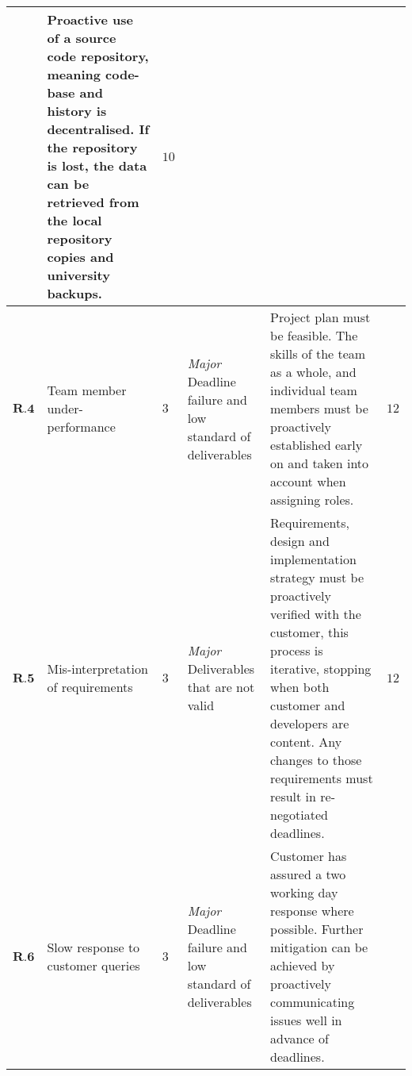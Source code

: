\begin{longtable}[H]{| p{0.6cm} | p{2cm} | p{0.3cm} | p{2.6cm} | p{8.1cm} | p{0.7cm} |}
    & Proactive use of a source code repository, meaning code-base and history is decentralised. If the repository is lost, the data can be retrieved from the local repository copies and university backups.                                                                                                                                                                                                                                                                                                        
    & $10$    \\ \hline
    $\textbf{R.4}$     & Team member under-performance                    & $3$         & \textit{Major}
\newline Deadline failure and low standard  of deliverables            
    & Project plan must be feasible. The skills of the team as a whole, and individual team members must be proactively established early on and taken into account when assigning roles.                                                                                                                                                                                                                                                                                                                                                              
    & $12$    \\ \hline
    $\textbf{R.5}$    & Mis-interpretation of requirements                & $3$        & \textit{Major}
\newline Deliverables that are not valid                                        & 
    Requirements, design and implementation strategy must be proactively verified with the customer, this process is iterative, stopping when both customer and developers are content. Any changes to those requirements must result in re-negotiated deadlines.                                                                                                                                                                                                                                                                                    
    & $12$    \\ \hline
    $\textbf{R.6}$    & Slow response to customer queries                & $3$        & \textit{Major}
\newline Deadline failure and  low standard of deliverables         
    & Customer has assured a two working day response where possible. Further mitigation can be achieved by proactively communicating issues well in advance of deadlines.                                                                                                                                                                                                                                                                                                                                                                            

\end{longtable}
